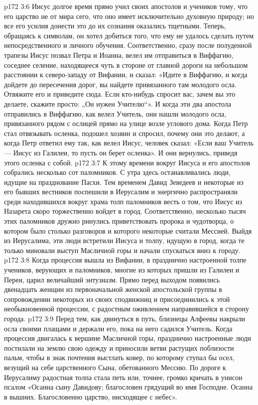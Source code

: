 \vs p172 3:6 \pc Иисус долгое время прямо учил своих апостолов и учеников тому, что его царство не от мира сего, что оно имеет исключительно духовную природу; но все его усилия донести это до их сознания оказались тщетными. Теперь, обращаясь к символам, он хотел добиться того, что ему не удалось сделать путем непосредственного и личного обучения. Соответственно, сразу после полуденной трапезы Иисус позвал Петра и Иоанна, велел им отправиться в Виффагию, соседнее селение, находящееся чуть в стороне от главной дороги на небольшом расстоянии к северо\hyp{}западу от Вифании, и сказал: «Идите в Виффагию, и когда дойдете до пересечения дорог, вы найдете привязанного там молодого осла. Отвяжите его и приведите сюда. Если кто\hyp{}нибудь спросит вас, зачем вы это делаете, скажите просто: „Он нужен Учителю“». И когда эти два апостола отправились в Виффагию, как велел Учитель, они нашли молодого осла, привязанного рядом с ослицей прямо на улице возле углового дома. Когда Петр стал отвязывать осленка, подошел хозяин и спросил, почему они это делают, а когда Петр ответил ему так, как велел Иисус, человек сказал: «Если ваш Учитель --- Иисус из Галилеи, то пусть он берет осленка». И они вернулись, приведя этого осленка с собой.
\vs p172 3:7 К этому времени вокруг Иисуса и его апостолов собрались несколько сот паломников. С утра здесь останавливались люди, идущие на празднование Пасхи. Тем временем Давид Зеведеев и некоторые из его бывших вестников поспешили в Иерусалим и энергично распространяли среди находившихся вокруг храма толп паломников весть о том, что Иисус из Назарета скоро торжественно войдет в город. Соответственно, несколько тысяч этих паломников дружно ринулись приветствовать пророка и чудотворца, о котором было столько разговоров и которого некоторые считали Мессией. Выйдя из Иерусалима, эти люди встретили Иисуса и толпу, идущую в город, когда те только миновали выступ Масличной горы и начали спускаться вниз к городу.
\vs p172 3:8 Когда процессия вышла из Вифании, в празднично настроенной толпе учеников, верующих и паломников, многие из которых пришли из Галилеи и Переи, царил величайший энтузиазм. Прямо перед выходом появились двенадцать женщин из первоначальной женской апостольской группы в сопровождении некоторых из своих сподвижниц и присоединились к этой необыкновенной процессии, с радостным оживлением направившейся в сторону города.
\vs p172 3:9 Перед тем, как двинуться в путь, близнецы Алфеевы накрыли осла своими плащами и держали его, пока на него садился Учитель. Когда процессия двигалась к вершине Масличной горы, празднично настроенные люди постилали на землю свою одежду и приносили ветви растущих поблизости пальм, чтобы в знак почтения выстлать ковер, по которому ступал бы осел, везущий на себе царственного Сына, обетованного Мессию. По дороге к Иерусалиму радостная толпа стала петь или, точнее, громко кричать в унисон псалом «Осанна сыну Давидову; благословен грядущий во имя Господне. Осанна в вышних. Благословенно царство, нисходящее с небес».

